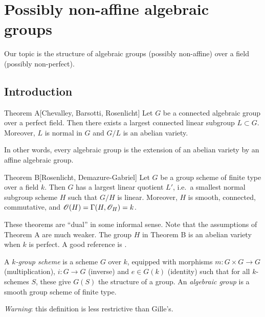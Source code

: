 
\section{Possibly non-affine algebraic groups}



Our topic is the structure of algebraic groups (possibly non-affine) over 
a field (possibly non-perfect). 




\subsection{Introduction}

\begin{enonce}{Theorem A}[Chevalley, Barsotti, Rosenlicht]
Let $G$ be a connected algebraic group over a perfect field. Then there exists 
a largest connected linear subgroup $L\subset G$. Moreover, $L$ is normal 
in $G$ and $G/L$ is an abelian variety. 
\end{enonce}

In other words, every algebraic group is the extension of an abelian variety by 
an affine algebraic group. 

\begin{enonce}{Theorem B}[Rosenlicht, Demazure-Gabriel]
Let $G$ be a group scheme of finite type over a field $k$. Then $G$ has a 
largest linear quotient $L'$, i.e.~a smallest normal subgroup scheme $H$ such 
that $G/H$ is linear. Moreover, $H$ is smooth, connected, commutative, and 
$\mathscr{O}(H) = \Gamma(H,\mathscr{O}_H) = k$. 
\end{enonce}

These theorems are ``dual'' in some informal sense. Note that the assumptions 
of Theorem A are much weaker. The group $H$ in Theorem B is an abelian variety 
when $k$ is perfect. A good reference is \cite{m14}. 

\begin{defi}
A \emph{$k$-group scheme} is a scheme $G$ over $k$, equipped with morphisms 
$m:G\times G\to G$ (multiplication), $i:G\to G$ (inverse) and 
$e\in G(k)$ (identity) such that for all $k$-schemes $S$, these give 
$G(S)$ the structure of a group. An \emph{algebraic group} is a smooth group 
scheme of finite type. 
\end{defi}

\emph{Warning}: this definition is less restrictive than Gille's. 

